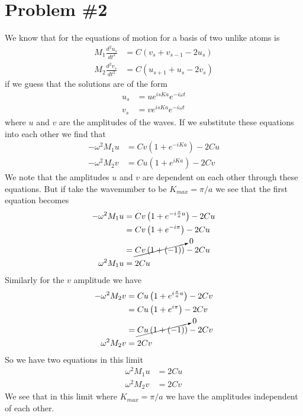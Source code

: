 \documentclass[11pt]{article}
\numberwithin{equation}{section}
\begin{document}
\section{Problem \#2}
We know that for the equations of motion for a basis of two unlike atoms is
\begin{align*}
M_1\frac{d^2u_s}{dt^2} &= C(v_s+v_{s-1}-2u_s)\\
M_2\frac{d^2v_s}{dt^2} &= C(u_{s+1}+u_{s}-2v_s)
\end{align*}
if we guess that the solutions are of the form
\begin{align*}
u_s &= ue^{isKa}e^{-i\omega t}\\
v_s &= ve^{isKa}e^{-i\omega t}
\end{align*}
where $u$ and $v$ are the amplitudes of the waves. If we substitute these equations into each other we find that
\begin{align*}
-\omega^2 M_1u &= Cv\left(1+e^{-iKa}\right) - 2Cu\\
-\omega^2 M_2v &= Cu\left(1+e^{iKa}\right) - 2Cv
\end{align*}
We note that the amplitudes $u$ and $v$ are dependent on each other through these equations. But if take the wavenumber to be $K_{max} = \pi/a$ we see that the first equation becomes
\begin{align*}
-\omega^2 M_1u &= Cv\left(1+e^{-i\frac{\pi}{a}a}\right) - 2Cu\\
&= Cv\left(1+e^{-i\pi}\right) - 2Cu\\
&= \cancelto{0}{Cv\left(1+(-1)\right)} - 2Cu\\
\omega^2 M_1u &= 2Cu
\end{align*}
Similarly for the $v$ amplitude we have
\begin{align*}
-\omega^2 M_2v &= Cu\left(1+e^{i\frac{\pi}{a}a}\right) - 2Cv\\
&= Cu\left(1+e^{i\pi}\right) - 2Cv\\
&= \cancelto{0}{Cu\left(1+(-1)\right)} - 2Cv\\
\omega^2 M_2v &= 2Cv
\end{align*}
So we have two equations in this limit
\begin{align*}
\omega^2 M_1u &= 2Cu\\
\omega^2 M_2v &= 2Cv
\end{align*}
We see that in this limit where $K_{max} = \pi/a$ we have the amplitudes independent of each other.
\end{document}
